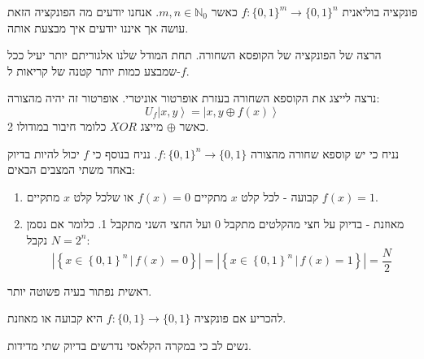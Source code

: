 \documentclass{tstextbook}
\begin{document}
\begin{definition}
פונקציה בוליאנית \(f:\{ 0,1 \}^{m}\to \{ 0,1 \}^{n}\) כאשר \(m,n \in \mathbb{N}_{0}\). אנחנו יודעים מה הפונקציה הזאת עושה אך איננו יודעים איך מבצעת אותה.

\end{definition}
\begin{definition}
הרצה של הפונקציה של הקופסא השחורה. תחת המודל שלנו אלגוריתם יותר יעיל ככל שמבצע כמות יותר קטנה של קריאות ל-\(f\).

\end{definition}
\begin{proposition}
נרצה לייצג את הקוספא השחורה בעזרת אופרטור אוניטרי. אופרטור זה יהיה מהצורה:
$$U_{f}\left|x,y\right\rangle=\left|x,y\oplus f\left(x\right)\right\rangle$$
כאשר \(\oplus\) מייצג \(XOR\) כלומר חיבור במודולו 2.

\end{proposition}
\begin{definition}
נניח כי יש קוספא שחורה מהצורה \(f:\{ 0,1 \}^{n}\to \{ 0,1 \}\). נניח בנוסף כי \(f\) יכול להיות בדיוק באחד משתי המצבים הבאים:

  \begin{enumerate}
    \item קבועה - לכל קלט \(x\) מתקיים \(f(x)=0\) או שלכל קלט \(x\) מתקיים \(f(x)=1\). 


    \item מאוזנת - בדיוק על חצי מהקלטים מתקבל 0 ועל החצי השני מתקבל 1. כלומר אם נסמן \(N=2^{n}\) נקבל: 
$$\left|\left\{x\in\left\{0,1\right\}^n\,|\,f\left(x\right)=0\right\}\right|=\left|\left\{x\in\left\{0,1\right\}^n\,|\,f\left(x\right)=1\right\}\right|=\frac{N}{2}$$


  \end{enumerate}
\end{definition}
ראשית נפתור בעיה פשוטה יותר.

\begin{definition}
להכריע אם פונקציה \(f:\{ 0,1 \}\to\{ 0,1 \}\) היא קבועה או מאוזנת.

\end{definition}
נשים לב כי במקרה הקלאסי נדרשים בדיוק שתי מדידות.
\end{document}
